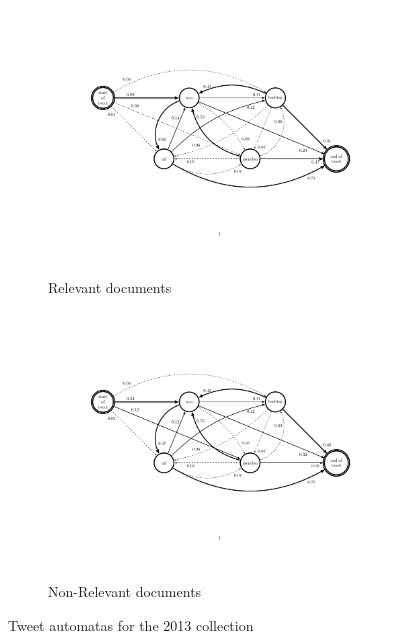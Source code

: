 \begin{figure}
\begin{smaller}

        \begin{subfigure}[b]{\textwidth}
        \vspace{-2.5cm}
        \hspace{-1.5cm}
        \includegraphics[width=17cm]{automatarelevant.pdf}	 
        \vspace{-4cm}  
        \caption{Relevant documents}
        
        \label{relevantautomata}
        \end{subfigure}
		
        \begin{subfigure}[b]{\textwidth}
        \vspace{-2.5cm}
        \hspace{-1.5cm}
        \includegraphics[width=17cm]{automatanonrelevant.pdf}
        \vspace{-4cm}
        \caption{Non-Relevant documents}
        \label{nonrelevantautomata}
        \end{subfigure}      
\end{smaller}

\caption{Tweet automatas for the 2013 collection}
\label{automatas}
\end{figure}



